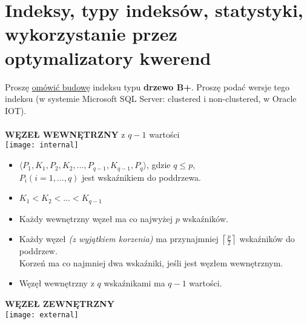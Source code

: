 \section{Indeksy, typy indeksów, statystyki, wykorzystanie przez
         optymalizatory kwerend}
\label{sec:indeksy}

\horrule{0.5pt}
Proszę \underline{omówić budowę} indeksu typu \textbf{drzewo B+}. Proszę
podać wersje tego indeksu (w systemie Microsoft SQL Server: clustered i
non-clustered, w Oracle IOT).\\
\horrule{0.5pt}\\

\textbf{WĘZEŁ WEWNĘTRZNY} z $q-1$ wartości\\

\begin{adjustbox}{width=\columnwidth,center}
    \texttt{[image: internal]}
\end{adjustbox}

\begin{itemize}
    \item $ \langle P_1, K_1, P_2, K_2, \ldots, P_{q-1}, K_{q-1}, P_q \rangle$,
          gdzie $q \leqslant p$,\\ $P_i (i = 1, \ldots, q)$ jest wskaźnikiem do
          poddrzewa.
    \item $K_1 < K_2 < \ldots < K_{q-1}$
    \item Każdy wewnętrzny węzeł ma co najwyżej $p$ wskaźników.
    \item Każdy węzeł \textit{(z wyjątkiem korzenia)} ma przynajmniej
          $\left\lceil \frac{p}{2} \right\rceil$ wskaźników do poddrzew.\\
          Korzeń ma co najmniej dwa wskaźniki, jeśli jest węzłem
          wewnętrznym.
    \item Węzęł wewnętrzny z $q$ wskaźnikami ma $q-1$ wartości.
\end{itemize}

\pagebreak
\textbf{WĘZEŁ ZEWNĘTRZNY}\\

\begin{adjustbox}{width=\columnwidth,center}
    \texttt{[image: external]}
\end{adjustbox}

